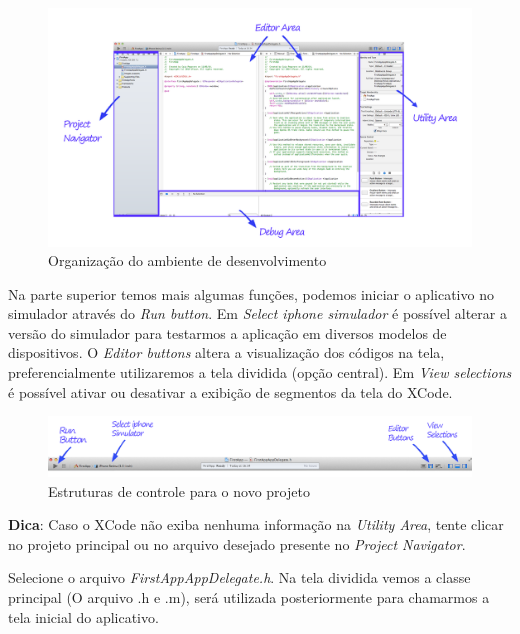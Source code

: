 \documentclass[a4paper,12pt,brazil,oneside]{book}
\begin{document}
\begin{figure}[H]
  \centering
  \includegraphics[width=.99\textwidth]{figuras/3/tela_principal_xcode.png}
  \caption{Organização do ambiente de desenvolvimento}
  \label{fig:a}
\end{figure}


Na parte superior temos mais algumas funções, podemos iniciar o aplicativo no simulador através do \emph{Run button}. Em \emph{Select iphone simulador} é possível alterar a versão do simulador para testarmos a aplicação em diversos modelos de dispositivos. O \emph{Editor buttons} altera a visualização dos códigos na tela, preferencialmente utilizaremos a tela dividida (opção central). Em \emph{View selections} é possível ativar ou desativar a exibição de segmentos da tela do XCode.

\begin{figure}[H]
  \centering
  \includegraphics[width=.85\textwidth]{figuras/3/tela_principal_xcode_run.png}
  \caption{Estruturas de controle para o novo projeto}
  \label{fig:a}
\end{figure}

\begin{framed}

\textbf{Dica}: Caso o XCode não exiba nenhuma informação na
\textit{Utility Area}, tente clicar no projeto principal ou no arquivo desejado presente no \textit{Project Navigator}.
\end{framed}


 Selecione o arquivo \emph{FirstAppAppDelegate.h}. Na tela dividida vemos a classe principal (O arquivo .h e .m), será utilizada posteriormente para chamarmos a tela inicial do aplicativo.
\end{document}
